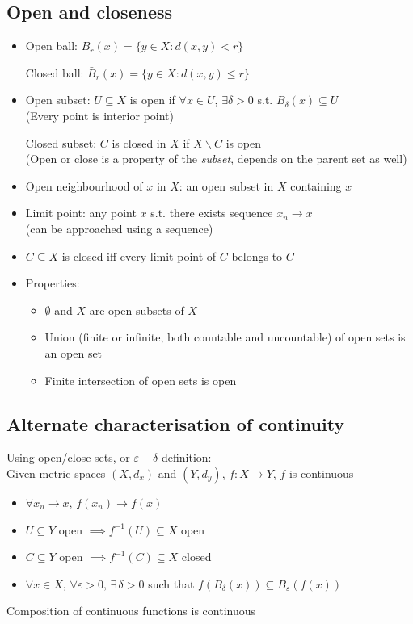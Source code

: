 \subsection*{Open and closeness}
\begin{itemize}
    \item Open ball:  $B_r(x) = \{ y \in X: d(x,y) < r\}$

          Closed ball: $\bar{B}_r(x) = \{ y \in X: d(x,y) \leq r\}$
    \item Open subset:
          $U \subseteq X$ is open if $\forall x \in U$, $\exists \delta >0$ s.t. $B_\delta(x) \subseteq U$ \\
          (Every point is interior point)

          Closed subset: $C$ is closed in $X$ if $X\backslash C$ is open \\
          (Open or close is a property of the \emph{subset}, depends on the parent set as well)
    \item Open neighbourhood of $x$ in $X$: an open subset in $X$ containing $x$
    \item Limit point: any point $x$ s.t. there exists sequence $x_n \to x$ \\ (can be approached using a sequence)
    \item $C \subseteq X$ is closed iff every limit point of $C$ belongs to $C$
    \item Properties:
          \begin{itemize}
              \item $\emptyset$ and $X$ are open subsets of $X$
              \item Union (finite or infinite, both countable and uncountable) of open sets is an open set
              \item Finite intersection of open sets is open
          \end{itemize}

\end{itemize}

\subsection*{Alternate characterisation of continuity}

Using open/close sets, or $\varepsilon-\delta$ definition:\\
Given metric spaces $(X,d_x)$ and $(Y,d_y)$, $f: X \to Y$, $f$ is continuous
\begin{itemize}
    \item $\forall x_n \to x$, $f(x_n) \to f(x)$
    \item $U\subseteq Y$ open $\implies f^{-1}(U) \subseteq X$ open
    \item $ C\subseteq Y$ open $\implies f^{-1}(C) \subseteq X$ closed
    \item $ \forall x\in X, \, \forall \varepsilon >0, \, \exists \, \delta>0$ such that $f(B_\delta(x)) \subseteq B_\varepsilon(f(x))$

\end{itemize}
Composition of continuous functions is continuous

